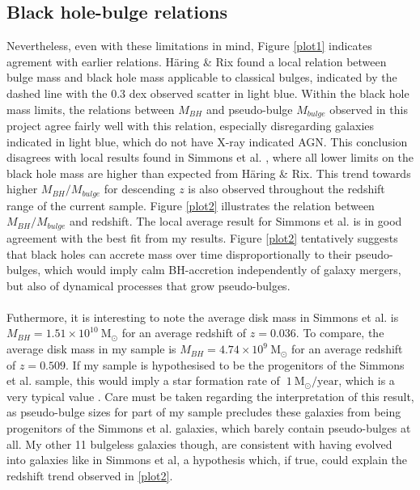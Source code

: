 \documentclass[11pt,twocolumn]{article}
\begin{document}
\subsection{Black hole-bulge relations}
 Nevertheless, even with these limitations in mind, Figure \ref{plot1} indicates agrement with earlier relations. H\"{a}ring \& Rix \cite{Haring:2004hr} found a local relation between bulge mass and black hole mass applicable to classical bulges, indicated by the dashed line with the 0.3 dex observed scatter in light blue. Within the black hole mass limits, the  relations between $M_{BH}$ and pseudo-bulge $M_{bulge}$ observed in this project agree fairly well with this relation, especially disregarding galaxies indicated in light blue, which do not have X-ray indicated AGN. This conclusion disagrees with local results found in Simmons et al. \cite{Simmons01032013}, where all lower limits on the black hole mass are higher than expected from H\"{a}ring \& Rix. This trend towards higher $M_{BH}/M_{bulge}$ for descending $z$ is also observed throughout the redshift range of the current sample. Figure \ref{plot2} illustrates the relation between $M_{BH}/M_{bulge}$  and redshift. The local average result for Simmons et al. is in good agreement with the best fit from my results. Figure \ref{plot2} tentatively suggests that black holes can accrete mass over time disproportionally to their pseudo-bulges, which would imply calm BH-accretion independently of galaxy mergers, but also of dynamical processes that grow pseudo-bulges. 
\paragraph{} Futhermore, it is interesting to note the average disk mass in Simmons et al. is $M_{BH} =1.51 \times 10^{10} \: \mathrm{M_{\odot}}$ for an average redshift of $z=0.036$. To compare, the average disk mass in my sample is $M_{BH} = 4.74 \times 10^{9} \: \mathrm{M_{\odot}}$ for an average redshift of $z=0.509$. If my sample is hypothesised to be the progenitors of the Simmons et al. sample, this would imply a star formation rate of $~ 1 \: \mathrm{M_{\odot}/year}$, which is a very typical value \cite{2004MNRAS.351.1151B}. Care must be taken regarding the interpretation of this result, as  pseudo-bulge sizes for part of my sample precludes these galaxies from being progenitors of the Simmons et al. galaxies, which barely contain pseudo-bulges at all. My other 11 bulgeless galaxies though, are consistent with having evolved into galaxies like in Simmons et al, a hypothesis which, if true, could explain the redshift trend observed in \ref{plot2}. 
\end{document}
